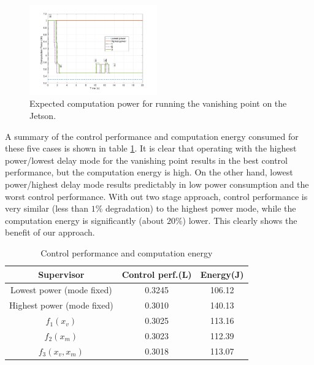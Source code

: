 \begin{figure}[hbtp]
\centering
\includegraphics[width=0.49\textwidth]{../simulations/figs/power.pdf}
\caption{Expected computation power for running the vanishing point on the Jetson.}
\label{fig:power} 
\end{figure}






A summary of the control performance and computation energy consumed for these five cases is shown in table \ref{tbl:performance}. It is clear that operating with the highest power/lowest delay mode for the vanishing point results in the best control performance, but the computation energy is high. On the other hand, lowest power/highest delay mode results predictably in low power consumption and the worst control performance. With out two stage approach, control performance is very similar (less than $1\%$ degradation) to the highest power mode, while the computation energy is significantly (about $20\%$) lower. This clearly shows the benefit of our approach.

\begin{table}[htb]
\begin{center}
\caption{Control performance and computation energy}
\label{tbl:performance}
\begin{tabular} {|c|c|c|}
	\hline
	\textbf{Supervisor} & \textbf{Control perf.}(L) & \textbf{Energy}(J) \\ \hline
	Lowest power (mode fixed) & 0.3245 & 106.12  \\ \hline
	Highest power (mode fixed) & 0.3010 & 140.13  \\ \hline
	 $f_1(x_v)$ & 0.3025 & 113.16  \\ \hline
	 $f_2(x_m)$ & 0.3023 & 112.39 \\ \hline
	 $f_3(x_v,x_m)$ & 0.3018 & 113.07 \\ \hline
	 
\end{tabular}
	\vspace{-10pt}	
	\end{center}
\end{table}


